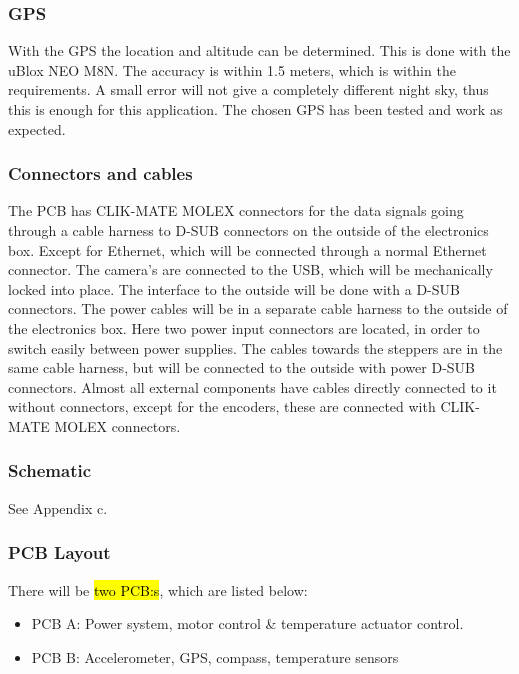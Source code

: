 {\subsubsection{GPS}
With the GPS the location and altitude can be determined. This is done with the uBlox NEO M8N. The accuracy is within 1.5 meters, which is within the requirements. A small error will not give a completely different night sky, thus this is enough for this application. The chosen GPS has been tested and work as expected.

\subsubsection{Connectors and cables}
The PCB has CLIK-MATE MOLEX connectors for the data signals going through a cable harness to D-SUB connectors on the outside of the electronics box. Except for Ethernet, which will be connected through a normal Ethernet connector. The camera's are connected to the USB, which will be mechanically locked into place. The interface to the outside will be done with a D-SUB connectors. The power cables will be in a separate cable harness to the outside of the electronics box. Here two power input connectors are located, in order to switch easily between power supplies. The cables towards the steppers are in the same cable harness, but will be connected to the outside with power D-SUB connectors. Almost all external components have cables directly connected to it without connectors, except for the encoders, these are connected with CLIK-MATE MOLEX connectors.


\subsubsection{Schematic}
See Appendix c.

\subsubsection{PCB Layout}
There will be \hl{ two PCB:s}, which are listed below:

\begin{itemize}
	\item 	PCB A: Power system, motor control \& temperature actuator control.
	\item	PCB B: Accelerometer, GPS, compass, temperature sensors
\end{itemize}


}
